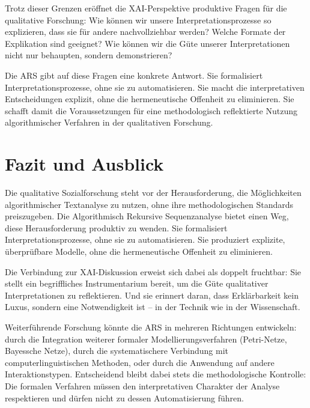 \documentclass[
  12pt,
  a4paper,
  oneside,
  titlepage
]{article}
\begin{document}
Trotz dieser Grenzen eröffnet die XAI-Perspektive produktive Fragen für die 
qualitative Forschung: Wie können wir unsere Interpretationsprozesse so 
explizieren, dass sie für andere nachvollziehbar werden? Welche Formate der 
Explikation sind geeignet? Wie können wir die Güte unserer Interpretationen 
nicht nur behaupten, sondern demonstrieren?

Die ARS gibt auf diese Fragen eine konkrete Antwort. Sie formalisiert 
Interpretationsprozesse, ohne sie zu automatisieren. Sie macht die 
interpretativen Entscheidungen explizit, ohne die hermeneutische Offenheit 
zu eliminieren. Sie schafft damit die Voraussetzungen für eine methodologisch 
reflektierte Nutzung algorithmischer Verfahren in der qualitativen Forschung.

\section{Fazit und Ausblick}

Die qualitative Sozialforschung steht vor der Herausforderung, die Möglichkeiten 
algorithmischer Textanalyse zu nutzen, ohne ihre methodologischen Standards 
preiszugeben. Die Algorithmisch Rekursive Sequenzanalyse bietet einen Weg, 
diese Herausforderung produktiv zu wenden. Sie formalisiert Interpretationsprozesse, 
ohne sie zu automatisieren. Sie produziert explizite, überprüfbare Modelle, 
ohne die hermeneutische Offenheit zu eliminieren.

Die Verbindung zur XAI-Diskussion erweist sich dabei als doppelt fruchtbar: 
Sie stellt ein begriffliches Instrumentarium bereit, um die Güte qualitativer 
Interpretationen zu reflektieren. Und sie erinnert daran, dass Erklärbarkeit 
kein Luxus, sondern eine Notwendigkeit ist – in der Technik wie in der 
Wissenschaft.

Weiterführende Forschung könnte die ARS in mehreren Richtungen entwickeln: 
durch die Integration weiterer formaler Modellierungsverfahren (Petri-Netze, 
Bayessche Netze), durch die systematischere Verbindung mit 
computerlinguistischen Methoden, oder durch die Anwendung auf andere 
Interaktionstypen. Entscheidend bleibt dabei stets die methodologische 
Kontrolle: Die formalen Verfahren müssen den interpretativen Charakter der 
Analyse respektieren und dürfen nicht zu dessen Automatisierung führen.
\end{document}
